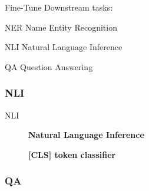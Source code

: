 \documentclass[10pt]{beamer}
\begin{document}
  \begin{frame}{Fine-Tune}
  Downstream tasks:
  \begin{exampleblock}{NER}
    Name Entity Recognition
  \end{exampleblock}

  \begin{exampleblock}{NLI}
    Natural Language Inference
  \end{exampleblock}

  \begin{exampleblock}{QA}
    Question Answering
  \end{exampleblock}

  \end{frame}

  \subsubsection*{NLI}

  \begin{frame}{NLI}
    \begin{figure}
      \centering
      \caption{\textbf{Natural Language Inference} }
    \end{figure}
    \begin{figure}
      \centering
      \caption{\textbf{[CLS] token classifier} }
    \end{figure}
  \end{frame}

  \subsubsection*{QA}
\end{document}
